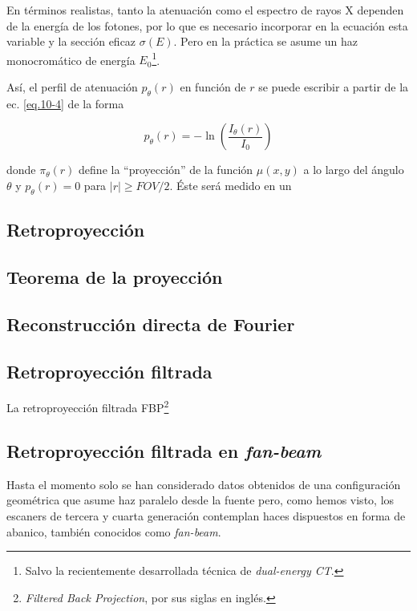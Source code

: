 En términos realistas, tanto la atenuación como el espectro de rayos X dependen de la energía de los fotones, por lo que es necesario incorporar en la ecuación esta variable y la sección eficaz $\sigma(E)$. Pero en la práctica se asume un haz monocromático de energía $E_0$\footnote{Salvo la recientemente desarrollada técnica de \emph{dual-energy CT}.}.

Así, el perfil de atenuación $p_{\theta}(r)$ en función de $r$  se puede escribir a partir de la ec. \ref{eq.10-4} de la forma

\begin{equation}
 p_{\theta}(r) = -\ln{\left(\frac{I_{\theta}(r)}{I_0}\right)}
 \label{eq.10-5}
\end{equation}

donde $\pi_{\theta}(r)$ define la ``proyección'' de la función $\mu(x,y)$ a lo largo del ángulo $\theta$ y $p_{\theta}(r) = 0$ para $|r| \geq FOV/2$. Éste será medido en un

\subsection{Retroproyecci\'on}

\subsection{Teorema de la proyecci\'on}

\subsection{Reconstrucci\'on directa de Fourier}

\subsection{Retroproyecci\'on filtrada}

La retroproyección filtrada FBP\footnote{\emph{Filtered Back Projection}, por sus siglas en inglés.}

\subsection{Retroproyecci\'on filtrada en \emph{fan-beam}}

Hasta el momento solo se han considerado datos obtenidos de una configuración geométrica que asume haz paralelo desde la fuente pero, como hemos visto, los escaners de tercera y cuarta generación contemplan haces dispuestos en forma de abanico, también conocidos como \emph{fan-beam}.

